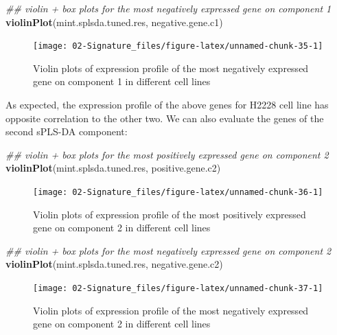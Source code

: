 \documentclass[]{book}
\newenvironment{Shaded}{\begin{snugshade}}{\end{snugshade}}
\newcommand{\CommentTok}[1]{\textcolor[rgb]{0.56,0.35,0.01}{\textit{#1}}}
\newcommand{\KeywordTok}[1]{\textcolor[rgb]{0.13,0.29,0.53}{\textbf{#1}}}
\newcommand{\NormalTok}[1]{#1}
\theoremstyle{definition}
\theoremstyle{definition}
\theoremstyle{definition}
\theoremstyle{remark}
\begin{document}
\begin{Shaded}
\begin{Highlighting}[]
\CommentTok{## violin + box plots for the most negatively expressed gene on component 1}
\KeywordTok{violinPlot}\NormalTok{(mint.splsda.tuned.res, negative.gene.c1)}
\end{Highlighting}
\end{Shaded}

\begin{figure}[ht]

{\centering \texttt{[image: 02-Signature\_files/figure-latex/unnamed-chunk-35-1]} 

}

\caption{Violin plots of expression profile of the most negatively expressed gene  on component 1 in different cell lines}\label{fig:unnamed-chunk-35}
\end{figure}

As expected, the expression profile of the above genes for H2228 cell
line has opposite correlation to the other two. We can also evaluate the
genes of the second sPLS-DA component:

\begin{Shaded}
\begin{Highlighting}[]
\CommentTok{## violin + box plots for the most positively expressed gene on component 2}
\KeywordTok{violinPlot}\NormalTok{(mint.splsda.tuned.res, positive.gene.c2)}
\end{Highlighting}
\end{Shaded}

\begin{figure}[ht]

{\centering \texttt{[image: 02-Signature\_files/figure-latex/unnamed-chunk-36-1]} 

}

\caption{Violin plots of expression profile of the most positively expressed gene on component 2 in different cell lines}\label{fig:unnamed-chunk-36}
\end{figure}

\begin{Shaded}
\begin{Highlighting}[]
\CommentTok{## violin + box plots for the most negatively expressed gene on component 2}
\KeywordTok{violinPlot}\NormalTok{(mint.splsda.tuned.res, negative.gene.c2)}
\end{Highlighting}
\end{Shaded}

\begin{figure}[ht]

{\centering \texttt{[image: 02-Signature\_files/figure-latex/unnamed-chunk-37-1]} 

}

\caption{Violin plots of expression profile of the most negatively expressed gene  on component 2 in different cell lines}\label{fig:unnamed-chunk-37}
\end{figure}
\end{document}

